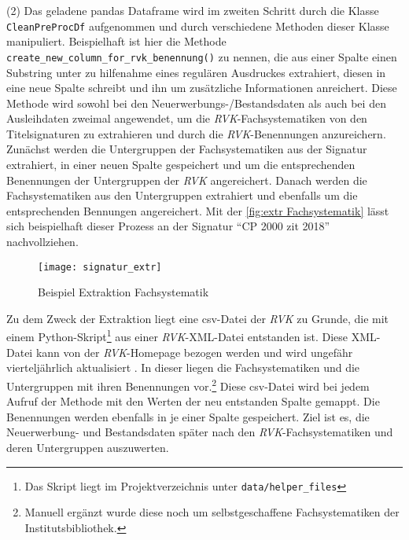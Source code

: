     (2) Das geladene pandas Dataframe wird im zweiten Schritt durch die Klasse \texttt{CleanPreProcDf} aufgenommen und durch verschiedene Methoden dieser Klasse
    manipuliert. Beispielhaft ist hier die Methode \texttt{create\_new\_column\_for\_rvk\_benennung()} zu nennen, die aus einer Spalte einen Substring unter
    zu hilfenahme eines regulären Ausdruckes extrahiert, diesen in eine neue Spalte schreibt und ihn um zusätzliche Informationen anreichert. 
    Diese Methode wird sowohl bei den Neuerwerbungs-/Bestandsdaten als auch bei den Ausleihdaten zweimal angewendet, um die \textit{\acrshort{RVK}}-Fachsystematiken von den
    Titelsignaturen zu extrahieren und durch die \textit{\acrshort{RVK}}-Benennungen anzureichern. 
    Zunächst werden die Untergruppen der Fachsystematiken aus der Signatur extrahiert, in einer neuen Spalte gespeichert und um die entsprechenden Benennungen der Untergruppen der 
    \textit{\acrshort{RVK}} angereichert. 
    Danach werden die Fachsystematiken aus den Untergruppen extrahiert und ebenfalls um die entsprechenden Bennungen angereichert.
    Mit der \autoref{fig:extr Fachsystematik} lässt sich beispielhaft dieser Prozess an der Signatur \enquote{CP 2000 zit 2018} nachvollziehen.
    \begin{figure}[H]
        \centering
            \texttt{[image: signatur\_extr]}
            \caption{Beispiel Extraktion Fachsystematik}
            \label{fig:extr Fachsystematik}
    \end{figure}

    Zu dem Zweck der Extraktion liegt eine csv-Datei der \textit{\acrshort{RVK}} zu Grunde, die mit einem Python-Skript\footnote{Das Skript liegt im Projektverzeichnis
    unter \texttt{data/helper\_files}} aus einer \textit{\acrshort{RVK}}-XML-Datei entstanden ist.
    Diese XML-Datei kann von der \textit{\acrshort{RVK}}-Homepage bezogen werden und wird ungefähr vierteljährlich aktualisiert \cite[vgl.][]{rvk_rvk_2021}.
    In dieser liegen die Fachsystematiken und die Untergruppen mit ihren Benennungen vor.\footnote{Manuell ergänzt wurde diese noch um selbstgeschaffene Fachsystematiken der Institutsbibliothek.}
    Diese csv-Datei wird bei jedem Aufruf der Methode mit den Werten der neu entstanden Spalte gemappt. Die Benennungen werden ebenfalls in je einer Spalte gespeichert.
    Ziel ist es, die Neuerwerbung- und Bestandsdaten später nach den \textit{\acrshort{RVK}}-Fachsystematiken und deren Untergruppen auszuwerten.
    
